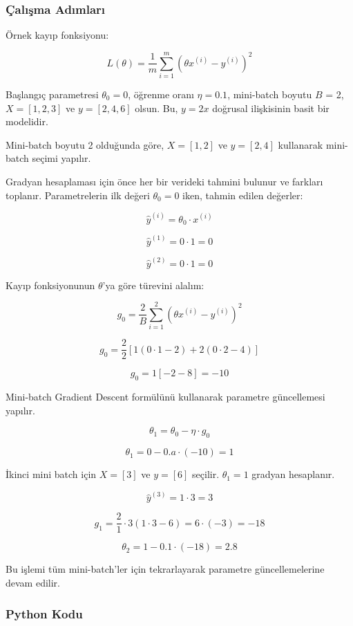 \subsubsection{Çalışma Adımları}

Örnek kayıp fonksiyonu:

\[ L(\theta) = \frac{1}{m} \sum_{i=1}^{m} (\theta x^{(i)} - y^{(i)})^2 \]

Başlangıç parametresi $\theta_0 = 0$, öğrenme oranı $\eta = 0.1$, mini-batch boyutu $B$ = 2, $X = [1, 2, 3]$ ve $y = [2, 4, 6]$ olsun. Bu, $y = 2x$ doğrusal ilişkisinin basit bir modelidir.

Mini-batch boyutu 2 olduğunda göre, $X = [1, 2]$ ve $y = [2, 4]$ kullanarak mini-batch seçimi yapılır. 

Gradyan hesaplaması için önce her bir verideki tahmini bulunur ve farkları toplanır. Parametrelerin ilk değeri $\theta_0 = 0$ iken, tahmin edilen değerler:

\[ \hat{y}^{(i)} = \theta_0 \cdot x^{(i)} \]

\[ \hat{y}^{(1)} = 0 \cdot 1 = 0 \]

\[ \hat{y}^{(2)} = 0 \cdot 1 = 0 \]

Kayıp fonksiyonunun $\theta$'ya göre türevini alalım:

\[ g_0 = \frac{2}{B} \sum_{i=1}^{2} (\theta x^{(i)} - y^{(i)})^2 \]

\[ g_0 = \frac{2}{2} [1(0 \cdot 1 - 2) + 2(0 \cdot 2 - 4)]\]

\[ g_0 = 1 [- 2 - 8] = -10 \]

Mini-batch Gradient Descent formülünü kullanarak parametre güncellemesi yapılır.

\[ \theta_1 = \theta_0 - \eta \cdot g_0 \]

\[ \theta_1 = 0 - 0.a \cdot (-10) = 1 \]

İkinci mini batch için $X = [3]$ ve $y = [6]$ seçilir. $\theta_1 = 1$ gradyan hesaplanır.

\[ \hat{y}^{(3)} = 1 \cdot 3 = 3 \]

\[ g_1 = \frac{2}{1} \cdot 3 (1 \cdot 3 - 6) = 6 \cdot (-3) = -18 \]

\[ \theta_2 = 1 - 0.1 \cdot (-18) = 2.8 \]

Bu işlemi tüm mini-batch'ler için tekrarlayarak parametre güncellemelerine devam edilir.

\subsubsection{Python Kodu}

